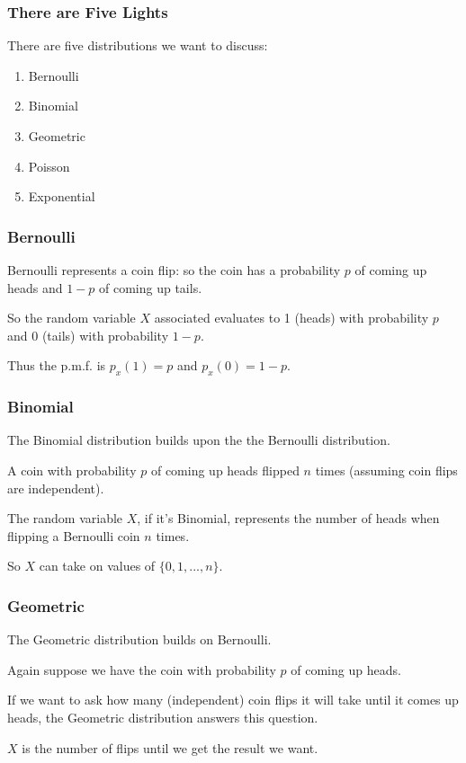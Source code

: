 \begin{frame}
\frametitle{There are Five Lights}

There are five distributions we want to discuss: 

\begin{enumerate}
	\item Bernoulli 
	\item Binomial
	\item Geometric
	\item Poisson
	\item Exponential
\end{enumerate}

\end{frame}



\begin{frame}
\frametitle{Bernoulli}

Bernoulli represents a coin flip: so the coin has a probability $p$ of coming up heads and $1-p$ of coming up tails. 

So the random variable $X$ associated evaluates to 1 (heads) with probability $p$ and 0 (tails) with probability $1-p$. 

Thus the p.m.f. is $p_{x}(1) = p$ and $p_{x}(0) = 1 - p$. 

\end{frame}



\begin{frame}
\frametitle{Binomial}

The Binomial distribution builds upon the the Bernoulli distribution. 

A coin with probability $p$ of coming up heads flipped $n$ times (assuming coin flips are independent). 

The random variable $X$, if it's Binomial, represents the number of heads when flipping a Bernoulli coin $n$ times. 

So $X$ can take on values of $\{0, 1, ..., n\}$. 

\end{frame}



\begin{frame}
\frametitle{Geometric}

The Geometric distribution builds on Bernoulli. 

Again suppose we have the coin with probability $p$ of coming up heads. 

If we want to ask how many (independent) coin flips it will take until it comes up heads, the Geometric distribution answers this question. 

$X$ is the number of flips until we get the result we want.


\end{frame}



